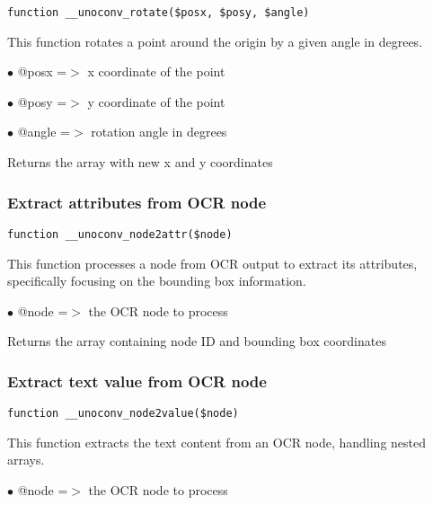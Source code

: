 \documentclass[a4paper]{article}
\begin{document}
\begin{lstlisting}
function __unoconv_rotate($posx, $posy, $angle)
\end{lstlisting}

This function rotates a point around the origin by a given angle in degrees.

\begin{compactitem}
\item[\color{myblue}$\bullet$] @posx  =$>$ x coordinate of the point
\item[\color{myblue}$\bullet$] @posy  =$>$ y coordinate of the point
\item[\color{myblue}$\bullet$] @angle =$>$ rotation angle in degrees
\end{compactitem}

Returns the array with new x and y coordinates

\hypertarget{toc545}{}
\subsubsection{Extract attributes from OCR node}

\begin{lstlisting}
function __unoconv_node2attr($node)
\end{lstlisting}

This function processes a node from OCR output to extract its attributes,
specifically focusing on the bounding box information.

\begin{compactitem}
\item[\color{myblue}$\bullet$] @node =$>$ the OCR node to process
\end{compactitem}

Returns the array containing node ID and bounding box coordinates

\hypertarget{toc546}{}
\subsubsection{Extract text value from OCR node}

\begin{lstlisting}
function __unoconv_node2value($node)
\end{lstlisting}

This function extracts the text content from an OCR node, handling nested arrays.

\begin{compactitem}
\item[\color{myblue}$\bullet$] @node =$>$ the OCR node to process
\end{compactitem}
\end{document}
